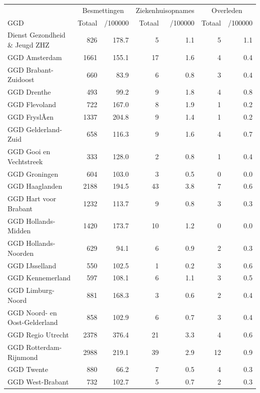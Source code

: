 \documentclass[
  english,
  man,floatsintext]{apa6}
\begin{document}
\begin{table}
\centering\begingroup\fontsize{10}{12}\selectfont

\begin{threeparttable}
\begin{tabular}{lrrrrrr}
\toprule
\multicolumn{1}{c}{ } & \multicolumn{2}{c}{Besmettingen} & \multicolumn{2}{c}{Ziekenhuisopnames} & \multicolumn{2}{c}{Overleden} \\
\cmidrule(l{3pt}r{3pt}){2-3} \cmidrule(l{3pt}r{3pt}){4-5} \cmidrule(l{3pt}r{3pt}){6-7}
GGD & Totaal & /100000 & Totaal & /100000 & Totaal & /100000\\
\midrule
Dienst Gezondheid \& Jeugd ZHZ & 826 & 178.7 & 5 & 1.1 & 5 & 1.1\\
GGD Amsterdam & 1661 & 155.1 & 17 & 1.6 & 4 & 0.4\\
GGD Brabant-Zuidoost & 660 & 83.9 & 6 & 0.8 & 3 & 0.4\\
GGD Drenthe & 493 & 99.2 & 9 & 1.8 & 4 & 0.8\\
GGD Flevoland & 722 & 167.0 & 8 & 1.9 & 1 & 0.2\\
GGD FryslÃ¢n & 1337 & 204.8 & 9 & 1.4 & 1 & 0.2\\
GGD Gelderland-Zuid & 658 & 116.3 & 9 & 1.6 & 4 & 0.7\\
GGD Gooi en Vechtstreek & 333 & 128.0 & 2 & 0.8 & 1 & 0.4\\
GGD Groningen & 604 & 103.0 & 3 & 0.5 & 0 & 0.0\\
GGD Haaglanden & 2188 & 194.5 & 43 & 3.8 & 7 & 0.6\\
GGD Hart voor Brabant & 1232 & 113.7 & 9 & 0.8 & 3 & 0.3\\
GGD Hollands-Midden & 1420 & 173.7 & 10 & 1.2 & 0 & 0.0\\
GGD Hollands-Noorden & 629 & 94.1 & 6 & 0.9 & 2 & 0.3\\
GGD IJsselland & 550 & 102.5 & 1 & 0.2 & 3 & 0.6\\
GGD Kennemerland & 597 & 108.1 & 6 & 1.1 & 3 & 0.5\\
GGD Limburg-Noord & 881 & 168.3 & 3 & 0.6 & 2 & 0.4\\
GGD Noord- en Oost-Gelderland & 858 & 102.9 & 6 & 0.7 & 3 & 0.4\\
GGD Regio Utrecht & 2378 & 376.4 & 21 & 3.3 & 4 & 0.6\\
GGD Rotterdam-Rijnmond & 2988 & 219.1 & 39 & 2.9 & 12 & 0.9\\
GGD Twente & 880 & 66.2 & 7 & 0.5 & 4 & 0.3\\
GGD West-Brabant & 732 & 102.7 & 5 & 0.7 & 2 & 0.3\\

\end{tabular}
\end{threeparttable}
\end{table}
\end{document}
